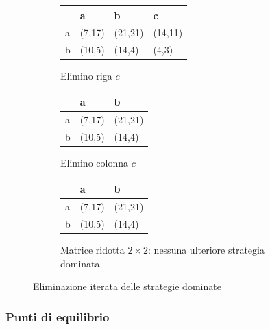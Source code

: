 \documentclass[\main/main.tex]{subfiles}
\begin{document}
\begin{figure}
  \begin{subfigure}{0.31\textwidth}
      \begin{tabular}{|L|L|L|L|}
        \hline
          & a      & b       & c       \\
        \hline
        a & (7,17) & (21,21) & (14,11) \\
        \hline
        b & (10,5) & (14,4)  & (4,3)   \\
        \hline
      \end{tabular}
    \caption{Elimino riga $c$}
    \label{2017_t1}
  \end{subfigure}
  \begin{subfigure}{0.31\textwidth}
      \begin{tabular}{|L|L|L|}
        \hline
          & a      & b       \\
        \hline
        a & (7,17) & (21,21) \\
        \hline
        b & (10,5) & (14,4)  \\
        \hline
      \end{tabular}
    \caption{Elimino colonna $c$}
    \label{2017_t2}
  \end{subfigure}
  \begin{subfigure}{0.31\textwidth}
      \begin{tabular}{|L|L|L|}
        \hline
          & a      & b       \\
        \hline
        a & (7,17) & (21,21) \\
        \hline
        b & (10,5) & (14,4)  \\
        \hline
      \end{tabular}
    \caption{Matrice ridotta $2 \times 2$: nessuna ulteriore strategia dominata}
    \label{2017_t3}
  \end{subfigure}
  \caption{Eliminazione iterata delle strategie dominate}
\end{figure}

\subsubsection*{Punti di equilibrio}
\end{document}

